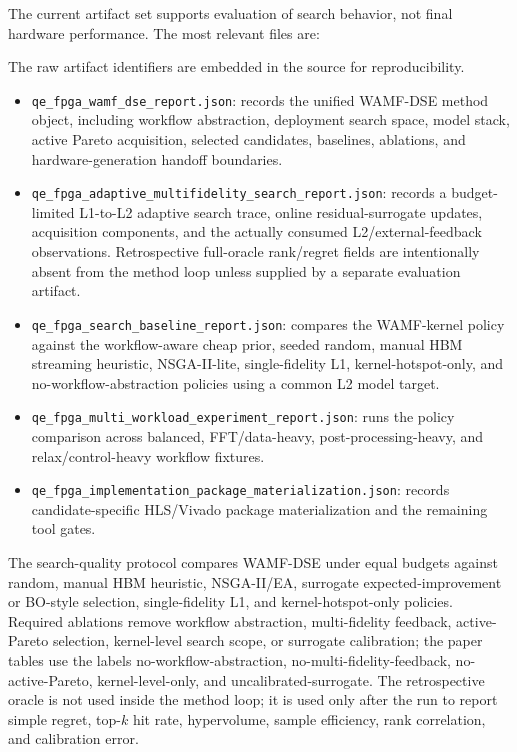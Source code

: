 \documentclass[sigconf,anonymous,review]{acmart}
\begin{document}
The current artifact set supports evaluation of search behavior, not final hardware performance.  The most relevant files are:

The raw artifact identifiers are embedded in the source for reproducibility.

\begin{itemize}
  \item \texttt{qe\_fpga\_wamf\_dse\_report.json}: records the unified WAMF-DSE method object, including workflow abstraction, deployment search space, model stack, active Pareto acquisition, selected candidates, baselines, ablations, and hardware-generation handoff boundaries.
  \item \texttt{qe\_fpga\_adaptive\_multifidelity\_search\_report.json}: records a budget-limited L1-to-L2 adaptive search trace, online residual-surrogate updates, acquisition components, and the actually consumed L2/external-feedback observations.  Retrospective full-oracle rank/regret fields are intentionally absent from the method loop unless supplied by a separate evaluation artifact.
  \item \texttt{qe\_fpga\_search\_baseline\_report.json}: compares the WAMF-kernel policy against the workflow-aware cheap prior, seeded random, manual HBM streaming heuristic, NSGA-II-lite, single-fidelity L1, kernel-hotspot-only, and no-workflow-abstraction policies using a common L2 model target.
  \item \texttt{qe\_fpga\_multi\_workload\_experiment\_report.json}: runs the policy comparison across balanced, FFT/data-heavy, post-processing-heavy, and relax/control-heavy workflow fixtures.
  \item \texttt{qe\_fpga\_implementation\_package\_materialization.json}: records candidate-specific HLS/Vivado package materialization and the remaining tool gates.
\end{itemize}

The search-quality protocol compares WAMF-DSE under equal budgets against random, manual HBM heuristic, NSGA-II/EA, surrogate expected-improvement or BO-style selection, single-fidelity L1, and kernel-hotspot-only policies.  Required ablations remove workflow abstraction, multi-fidelity feedback, active-Pareto selection, kernel-level search scope, or surrogate calibration; the paper tables use the labels no-workflow-abstraction, no-multi-fidelity-feedback, no-active-Pareto, kernel-level-only, and uncalibrated-surrogate.  The retrospective oracle is not used inside the method loop; it is used only after the run to report simple regret, top-$k$ hit rate, hypervolume, sample efficiency, rank correlation, and calibration error.
\end{document}
